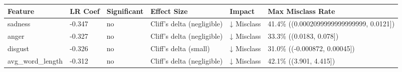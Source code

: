 \begin{tabular}{llllll}
\toprule
Feature & LR Coef & Significant & Effect Size & Impact & Max Misclass Rate \\
\midrule
sadness & -0.347 & no & Cliff's delta (negligible) & ↓ Misclass & 41.4\% ((0.0002099999999999999, 0.0121]) \\
anger & -0.327 & no & Cliff's delta (negligible) & ↓ Misclass & 33.3\% ((0.0183, 0.078]) \\
disgust & -0.326 & no & Cliff's delta (small) & ↓ Misclass & 31.0\% ((-0.000872, 0.00045]) \\
avg\_word\_length & -0.312 & no & Cliff's delta (negligible) & ↓ Misclass & 42.1\% ((3.901, 4.415]) \\
\bottomrule
\end{tabular}
